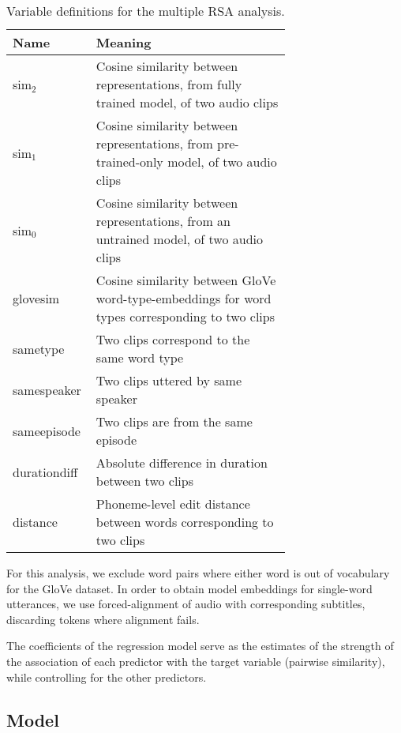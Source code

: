 \begin{table}
  \centering
  \begin{tabular}{lp{0.7\linewidth}}\toprule
    Name              & Meaning \\\midrule
    sim$_2$           & Cosine similarity between representations,
                        from fully trained model,
                        of two audio clips \\
    sim$_1$           & Cosine similarity between representations,
                        from pre-trained-only model,  of two audio
                        clips \\
    sim$_0$           & Cosine similarity between representations,
                        from an untrained model, of two audio clips \\
    glovesim          & Cosine similarity between GloVe word-type-embeddings for word types corresponding to two clips\\
    sametype          & Two clips correspond to the same word type \\
    samespeaker       & Two clips uttered by same speaker\\
    sameepisode       & Two clips are from the same episode\\
    durationdiff      & Absolute difference in duration between two clips\\
    distance          & Phoneme-level edit distance between words corresponding to two clips\\\bottomrule
  \end{tabular}
  \caption{Variable definitions for the multiple RSA analysis.}
  \label{tab:grsa-variables}
\end{table}
For this analysis, we exclude word pairs where either word is out of
vocabulary for the GloVe dataset. In order to obtain model embeddings
for single-word utterances, we use forced-alignment of audio with
corresponding subtitles, discarding tokens where alignment fails.

The coefficients of the regression model serve as the estimates of the
strength of the association of each predictor with the target variable
(pairwise similarity), while controlling for the other predictors. 


\subsection{Model}

